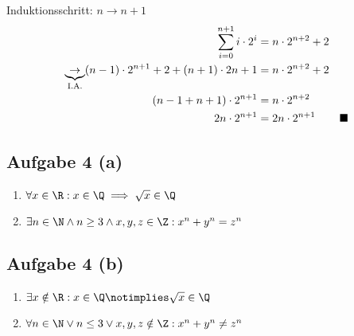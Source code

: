 	Induktionsschritt: $n \to n+1$ \\

	\begin{align}
		\sum_{i=0}^{n+1} i \cdot 2^{i} &= n \cdot 2^{n+2} + 2 \\
		\underbrace{\to}_{\text{I.A.}} (n-1) \cdot 2^{n+1} + 2 + (n+1) \cdot 2{n+1} &= n \cdot 2^{n+2} + 2 \\
		(n-1+n+1) \cdot 2^{n+1} &= n \cdot 2^{n+2} \\
		2n \cdot 2^{n+1} &= 2n \cdot 2^{n+1} \hspace{5ex} \blacksquare
	\end{align}


	\subsection*{Aufgabe 4 (a)}

	\begin{enumerate}
		\item $ \forall x  \in \R : x \in \Q  \implies \sqrt{x} \in \Q $
		\item $ \exists n \in \N \land n \geq 3 \land x, y, z \in \Z : x^n + y^n = z^n $
	\end{enumerate}


	\subsection*{Aufgabe 4 (b)}

	\begin{enumerate}
		\item $ \exists x  \notin \R : x \in \Q  \notimplies \sqrt{x} \in \Q $
		\item $ \forall n \in \N \lor n \le 3 \lor x, y, z \notin \Z : x^n + y^n \neq z^n $
	\end{enumerate}

